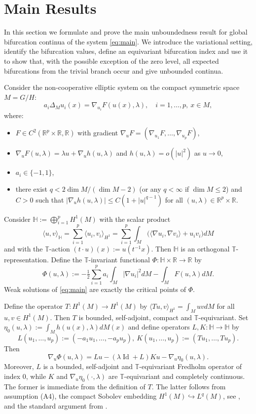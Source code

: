 \documentclass[reqno,twoside,12pt]{amsart}
\newcommand{\bH}{\mathbb{H}}
\newcommand{\bR}{\mathbb{R}}
\newcommand{\bT}{\mathbb{T}}
\numberwithin{equation}{section} \errorcontextlines=0
\newcommand{\Id}{\operatorname{Id}}
\begin{document}
\section{Main Results}\label{sec:main}
In this section we formulate and prove the main unboundedness result for global bifurcation continua of the system \eqref{eq:main}. We introduce the variational setting, identify the bifurcation values, define an equivariant bifurcation index and use it to show that, with the possible exception of the zero level, all expected bifurcations from the trivial branch occur and give unbounded continua.

Consider the non-cooperative elliptic system on the compact symmetric space $M=G/H$:
\begin{equation}\label{eq:main}
a_i\Delta_M u_i(x)=\nabla_{u_i}F(u(x),\lambda),\quad i=1,\dots,p,\ x\in M,
\end{equation}
where:
\begin{itemize}
\item[(A1)] $F\in C^2(\bR^p\times\bR,\bR)$ with gradient $\nabla_uF=(\nabla_{u_1}F,\dots,\nabla_{u_p}F)$,
\item[(A2)] $\nabla_uF(u,\lambda)=\lambda u+\nabla_u h(u,\lambda)$ and $h(u,\lambda)=o(|u|^2)$ as $u\to 0$,
\item[(A3)] $a_i\in\{-1,1\}$,
\item[(A4)] there exist $q<2\dim M/(\dim M-2)$ (or any $q<\infty$ if $\dim M\le 2$) and  $C>0$ such that $|\nabla_u h(u,\lambda)|\le C(1+|u|^{q-1})$ for all $(u,\lambda)\in\bR^p\times\bR$.
\end{itemize}

Consider $\bH:=\bigoplus_{i=1}^p H^1(M)$  with the scalar product
\[
\langle u,v\rangle_{\bH}=\sum_{i=1}^p\langle u_i,v_i\rangle_{H^1}
=
\sum_{i=1}^p\int_M\bigl(\langle \nabla u_i,\nabla v_i\rangle+u_iv_i\bigr)dM
\]
and with the $\bT$-action $(t\cdot u)(x):=u(t^{-1}x)$. Then $\bH$ is an orthogonal $\bT$-representation.
 Define the $\bT$-invariant functional $\Phi:\bH\times\bR\to\bR$ by
\[
\Phi(u,\lambda):=-\tfrac12\sum_{i=1}^p a_i\int_M|\nabla u_i|^2 dM -\int_M F(u,\lambda) dM .
\]
Weak solutions of \eqref{eq:main} are exactly the critical points of $\Phi$.

Define the operator $T:H^1(M)\to H^1(M)$ by
$
\langle Tu,v\rangle_{H^1}=\int_M uv dM$  for all $u,v\in H^1(M).$
Then $T$ is bounded, self-adjoint, compact and $\bT$-equivariant. Set
$
\eta_0(u,\lambda):=\int_M h(u(x),\lambda) dM(x)
$
and define operators $L,K:\bH\to\bH$ by
$$
L(u_1,\dots,u_p):=(-a_1u_1,\dots,-a_pu_p),\
K(u_1,\dots,u_p):=(Tu_1,\dots,Tu_p).$$
Then
\[
\nabla_u\Phi(u,\lambda)=Lu-(\lambda\Id+L)Ku-\nabla_u\eta_0(u,\lambda).
\]
Moreover, $L$ is a bounded, self-adjoint and $\bT$-equivariant Fredholm operator of index $0$, while $K$ and $\nabla_u\eta_0(\cdot,\lambda)$ are $\bT$-equivariant and completely continuous. The former is immediate from the definition of $T$. The latter follows from assumption \textup{(A4)}, the compact Sobolev embedding $H^1(M)\hookrightarrow L^q(M)$, see \cite{Aubin,Hebey}, and the standard argument from \cite{Rabinowitz1986}.
\end{document}
